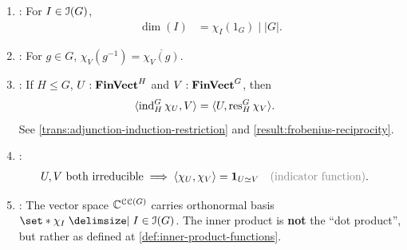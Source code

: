 \begin{enumerate}[leftmargin=*, label=(G\arabic*)]
{\begin{align*}
      &= 0
    \end{align*}
    whilst to give the square-norm of a column, we have
    \begin{align*}
      \sum_{i = 0}^{k - 1}
        \lvert \chi_{I_i} (g) \rvert^2
      &= \frac{\lvert G \rvert}{\lvert \Class(g) \rvert}
      = \lvert \Centraliser(G) \rvert
      .
    \end{align*}
  }
  \item\label{grammar:dimensions-divide-order} {
    :
    \pan For $I \in \operatorname{\mathcal{I}}(G)$,
    \begin{align*}
      \dim(I)
      &= \chi_I (1_G)
      \mid \lvert G \rvert
      .
    \end{align*}
    }
  \item\label{grammar:inverses} {
    : For $g \in G$, $\chi_V (g^{-1}) = \overline{\chi_V (g)}$.
  }
  \item\label{grammar:reciprocity} {
    : If $H \leq G$, $U : \operatorname{\mathbf{FinVect}}^H$ and $V : \operatorname{\mathbf{FinVect}}^G$, then
    \begin{align*}
      \langle \operatorname{ind}_H^G \chi_U , V \rangle
      &= \langle U, \operatorname{res}^G_H \chi_V \rangle
      .
    \end{align*}
    See \ref{trans:adjunction-induction-restriction} and \ref{result:frobenius-reciprocity}.
  }
  \item\label{grammar:orthonormality-irreducibles} {
    :
    \begin{align*}
      U, V \text{ both irreducible}
      &\implies \langle \chi_U, \chi_V \rangle = \one_{U \simeq V}
      \quad
      \ignore{\text{(indicator function)}}
      .
    \end{align*}
  }
  \item\label{grammar:irreducible-characters-orthonormal-basis} {
    : The vector space $\mathbb{C}^{\operatorname{\mathcal{CC}}(G)}$ carries orthonormal basis $\set*{ \chi_I \given I \in \Irred(G) }$. The inner product is \textbf{not} the ``dot product'', but rather as defined at \ref{def:inner-product-functions}.
  }
\end{enumerate}

\skoop

